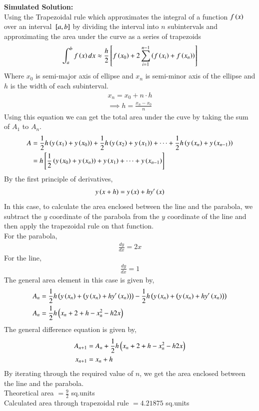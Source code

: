 \documentclass[journal]{IEEEtran}
\begin{document}
\textbf{Simulated Solution:}\\
Using the Trapezoidal rule which approximates the integral of a function $f\left(x\right)$ over an interval ${}\left[a,b\right]$ by dividing the interval into $n$ subintervals and approximating the area under the curve as a series of trapezoids
\begin{align}
    \int_a^b f\left(x\right)dx\approx\frac{h}{2}{}\left[f\left(x_0\right)+2\sum_{i=1}^{n-1}\left(f\left(x_i\right)+f\left(x_n\right)\right)\right]
\end{align}
Where $x_0$ is semi-major axis of ellipse and $x_n$ is semi-minor axis of the ellipse and $h$ is the width of each subinterval.
\begin{align}
    x_n=x_0+n\cdot h\\
    \implies h=\frac{x_n-x_0}{n}
\end{align}
Using this equation we can get the total area under the cuve by taking the sum of $A_1$ to $A_n$.\\
\begin{align}
	A &= \frac{1}{2} h \left(y \left(x_1\right) + y \left(x_0\right)\right)+ \frac{1}{2} h \left(y \left(x_2\right) + y \left(x_1\right)\right) + \dots + \frac{1}{2} h \left(y \left(x_n\right) + y\left(x_{n-1}\right)\right)\\
	&= h {}\left[\frac{1}{2} \left(y \left(x_0\right) + y \left(x_n\right)\right) + y \left(x_1\right) + \dots + y \left(x_{n-1}\right)\right]
\end{align}
By the first principle of derivatives,\\
\begin{align}
	y\left(x+h\right) = y\left(x\right) + h y^{\prime}\left(x\right)
\end{align}
In this case, to calculate the area enclosed between the line and the parabola, we subtract the $y$ coordinate of the parabola from the $y$ coordinate of the line and then apply the trapezoidal rule on that function.\\
For the parabola,
\begin{align}
	\frac{dy}{dx} = 2x
\end{align}
For the line,
\begin{align}
	\frac{dy}{dx} = 1
\end{align}
The general area element in this case is given by,
\begin{align}
	A_n &= \frac{1}{2} h \left(y\left(x_n\right) + \left(y\left(x_n\right) + hy^\prime\left(x_n\right)\right)\right) - \frac{1}{2} h \left(y\left(x_n\right) + \left(y\left(x_n\right) + hy^\prime\left(x_n\right)\right)\right)\\
	A_n &= \frac{1}{2} h \left(x_n + 2 + h - x_n^2 - h2x\right)\\
\end{align}
The general difference equation is given by,
\begin{align}
	A_{n+1} &= A_n + \frac{1}{2}h\left(x_n + 2 + h - x_n^2 - h2x\right)\\
	x_{n+1} &= x_n + h
\end{align}
By iterating through the required value of $n$, we get the area enclosed between the line and the parabola.\\
Theoretical area $= \frac{9}{2}$ sq.units\\
Calculated area through trapezoidal rule $=4.21875$ sq.units\\
\end{document}
